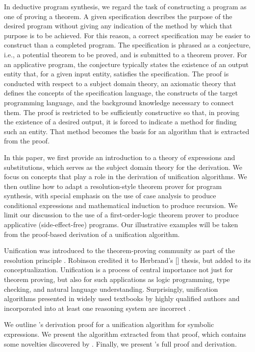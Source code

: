 \documentclass[runningheads]{llncs}
\begin{document}
     In deductive program synthesis, we regard the task of constructing a program as one of proving a theorem.  A given specification describes the purpose of the desired program without giving any indication of the method by which that purpose is to be achieved. For this reason, a correct specification may be easier to construct than a completed program. The specification is phrased as a conjecture, i.e., a potential theorem to be proved, and is submitted to a theorem prover.  For an applicative program, the conjecture typically states the existence of an output entity that, for a given input entity, satisfies the specification.  The proof is conducted with respect to a subject domain theory, an axiomatic theory that defines the concepts of the specification language, the constructs of the target programming language, and the background knowledge necessary to connect them.  The proof is restricted to be sufficiently constructive so that, in proving the existence of a desired output, it is forced to indicate a method for finding such an entity.  That method becomes the basis for an algorithm that is extracted from the proof.  

In this paper, we first provide an introduction to a theory of expressions and substitutions, which serves as the subject domain theory for the derivation. We focus on concepts that play a role in the derivation of unification algorithms.
We then outline how to adapt a resolution-style theorem prover for program synthesis, with special emphasis on the use of case analysis to produce conditional expressions and mathematical induction to produce recursion.  We limit our discussion to the use of a first-order-logic theorem prover to produce applicative (side-effect-free) programs. Our illustrative examples will be taken from the proof-based derivation of a unification algorithm.  

    Unification was introduced to the theorem-proving community as part of the resolution principle  \citep{rob}.  Robinson credited it to  Herbrand's [\citeyear{her}] thesis, but added to its conceptualization. Unification is a process of central importance not just for theorem proving, but also for such applications as logic programming, type checking, and natural language understanding.  Surprisingly, unification algorithms presented in widely used textbooks by highly qualified authors and incorporated into at least one reasoning system are incorrect  \citep{nor}.
    
    We outline \SNARK's derivation proof for a unification algorithm for symbolic expressions.  We present the algorithm extracted from that proof, which contains some novelties discovered by \SNARK.  Finally, we present \SNARK's full proof and derivation.
\end{document}
